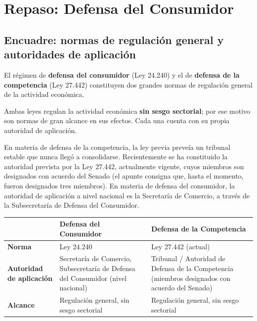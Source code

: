 \documentclass[12pt,oneside]{book}
\begin{document}
\tableofcontents


\chapter[Repaso: Defensa del Consumidor]{Repaso: Defensa del Consumidor}

\section{Encuadre: normas de regulación general y autoridades de aplicación}

El régimen de \textbf{defensa del consumidor} (Ley 24.240) y el de \textbf{defensa de la competencia} (Ley 27.442) constituyen dos grandes normas de regulación general de la actividad económica.

\begin{important}
Ambas leyes regulan la actividad económica \textbf{sin sesgo sectorial}; por ese motivo son normas de gran alcance en sus efectos. Cada una cuenta con su propia autoridad de aplicación.
\end{important}

En materia de defensa de la competencia, la ley previa preveía un tribunal estable que nunca llegó a consolidarse. Recientemente se ha constituido la autoridad prevista por la Ley 27.442, actualmente vigente, cuyos miembros son designados con acuerdo del Senado (el apunte consigna que, hasta el momento, fueron designados tres miembros). En materia de defensa del consumidor, la autoridad de aplicación a nivel nacional es la Secretaría de Comercio, a través de la Subsecretaría de Defensa del Consumidor.

\begin{table}[H]
\centering
\renewcommand{\arraystretch}{1.25}
\begin{tabularx}{\textwidth}{
    >{\raggedright\arraybackslash}p{}
    >{\raggedright\arraybackslash}X
    >{\raggedright\arraybackslash}X
}
\toprule
 & \textbf{Defensa del Consumidor} & \textbf{Defensa de la Competencia} \\
\midrule
\textbf{Norma} & Ley 24.240 & Ley 27.442 (actual) \\
\textbf{Autoridad de aplicación} & Secretaría de Comercio, Subsecretaría de Defensa del Consumidor (nivel nacional) & Tribunal / Autoridad de Defensa de la Competencia (miembros designados con acuerdo del Senado) \\
\textbf{Alcance} & Regulación general, sin sesgo sectorial & Regulación general, sin sesgo sectorial \\
\bottomrule
\end{tabularx}
\end{table}
\end{document}
